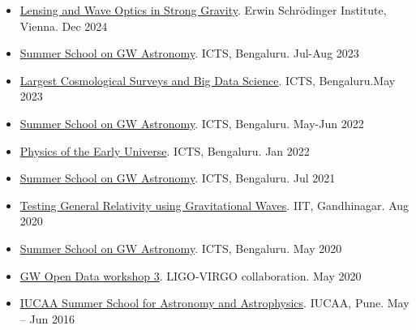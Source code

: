 \begin{itemize}
    \item \href{https://www.esi.ac.at/events/e546}{Lensing and Wave Optics in Strong Gravity}. Erwin Schr\"odinger Institute, Vienna. \hfill{Dec 2024}
    
    \item \href{https://www.icts.res.in/program/gws2023}{Summer School on GW Astronomy}. ICTS, Bengaluru. \hfill{Jul-Aug 2023}
    
    \item \href{https://icts.res.in/program/BigDataCosmo}{Largest Cosmological Surveys and Big Data Science}. ICTS, Bengaluru.\hfill{May 2023}

    \item \href{https://www.icts.res.in/program/gws2022}{Summer School on GW Astronomy}. ICTS, Bengaluru. \hfill{May-Jun 2022}
    
    \item \href{https://www.icts.res.in/program/peu2022}{Physics of the Early Universe}. ICTS, Bengaluru. \hfill{Jan 2022}
    
    \item \href{https://www.icts.res.in/program/gws2021}{Summer School on GW Astronomy}. ICTS, Bengaluru. \hfill{Jul 2021}
    
    \item \href{https://events.iitgn.ac.in/2020/TGRGW/}{Testing General Relativity using Gravitational Waves}. IIT, Gandhinagar. \hfill{Aug 2020}
    
    \item \href{https://www.icts.res.in/program/gws2020}{Summer School on GW Astronomy}. ICTS, Bengaluru. \hfill{May 2020}
    
    \item \href{https://www.gw-openscience.org/static/workshop3/}{GW Open Data workshop 3}. LIGO-VIRGO collaboration. \hfill{May 2020}
    
    \item \href{https://www-apps.iucaa.in/Stu-Prog-ISSIA.html}{IUCAA Summer School for Astronomy and Astrophysics}. IUCAA, Pune. \hfill{May -- Jun 2016}
    
\end{itemize}
